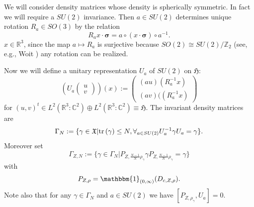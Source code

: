 \documentclass[a4paper]{amsart}
\def\tr{{\rm tr \,}}
\def\gH{\mathfrak{H}}
\def\gX{\mathfrak{X}}
\def\cz{\mathbb{C}} %
\def\rz{\mathbb{R}} %
\begin{document}
We will consider density matrices whose density is spherically
symmetric. In fact we will require a $SU(2)$ invariance. Then 
$a\in SU(2)$ determines unique rotation $R_a\in SO(3)$ by the relation
\begin{equation}\label{eq:A-RA-identity}
  R_ax \cdot \boldsymbol\sigma = a\circ(x\cdot\boldsymbol\sigma)\circ a^{-1}.
\end{equation} 
$x\in \rz^3$, since the map $a\mapsto R_a$ is surjective because
$SO(2)\cong SU(2)/\mathbb{Z}_2$ (see, e.g., Woit \cite{Woit2017}) any
rotation can be realized.

Now we will define a unitary representation $U_a$ of $SU(2)$ on $\gH$:
\begin{equation}
  \left(U_a
  \begin{pmatrix}
    u\\v
  \end{pmatrix}\right)(x)
:= \begin{pmatrix} (au) (R_a^{-1}x)\\
(av)((R_a^{-1}x)
\end{pmatrix}
\end{equation}
for $(u,v)^t\in L^2(\rz^3:\cz^2)\oplus L^2(\rz^3:\cz^2)\equiv \gH$. The invariant density matrices are 
\begin{equation}
  \Gamma_{N}:=\{\gamma \in\gX| \tr(\gamma)\leq N, \forall_{a\in SU(2)} U_a^{-1}\gamma U_a=\gamma \}.
\end{equation}
Moreover set
\begin{equation}
    \Gamma_{Z,N}:=\{\gamma \in \Gamma_{N}| P_{Z,\frac{N-1}N\rho_\gamma}\gamma P_{Z,\frac{N-1} N\rho_\gamma}=\gamma\}
\end{equation}
with
\begin{equation}
    P_{Z,\rho}= \mathbbm{1}_{(0,\infty)}(D_{c,Z,\rho}).
  \end{equation}
  Note also that for any $\gamma\in\Gamma_N$ and $a\in SU(2)$ we have
  $[P_{Z,\rho_\gamma},U_a]=0$.
\end{document}
